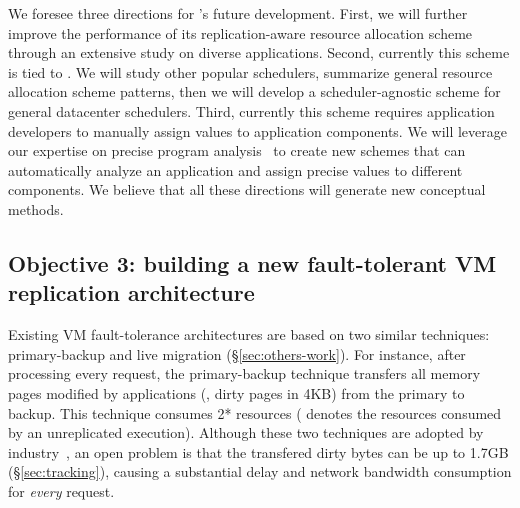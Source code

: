 
 We foresee three directions for \tripod's future 
development. First, we will further improve the performance of its 
replication-aware resource allocation scheme through an extensive study on 
diverse applications. Second, currently this scheme is tied to \mesos. We will 
study other popular schedulers, summarize general resource allocation scheme 
patterns, then we will develop a scheduler-agnostic scheme for general 
datacenter schedulers. Third, currently this scheme requires application 
developers to manually assign  values to application components. We will 
leverage our expertise on precise 
program analysis~\cite{peregrine:sosp11,woodpecker:asplos13} to create new 
schemes that can automatically analyze an application and assign precise  
values to different components. We believe that all these directions will 
generate new conceptual methods.

\vspace{-.15in}\subsection{Objective 3: building a new fault-tolerant VM 
replication architecture}\label{sec:vm}\vspace{-.075in}



Existing VM fault-tolerance architectures are based on two similar 
techniques: primary-backup and live migration (\S\ref{sec:others-work}). For 
instance, after processing every request, the primary-backup technique 
transfers all memory pages modified by applications (\ie, dirty pages in 4KB) 
from the primary to backup. This technique consumes 2* resources ( 
denotes the resources consumed by an unreplicated execution). Although these 
two techniques are adopted by industry~\cite{ftvm}, an open problem is that the 
transfered dirty bytes can be up to 1.7GB (\S\ref{sec:tracking}), causing a 
substantial  delay and network bandwidth consumption for \emph{every} request.

